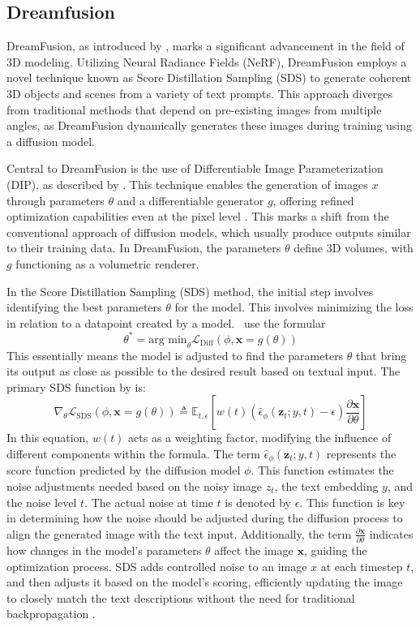 \subsection{Dreamfusion}\label{dreamfusion}

DreamFusion, as introduced by \citeauthor{pooleDreamfusion}, marks a significant advancement in the field of 3D modeling. Utilizing Neural Radiance Fields (NeRF), DreamFusion employs a novel technique known as Score Distillation Sampling (SDS) to generate coherent 3D objects and scenes from a variety of text prompts. This approach diverges from traditional methods that depend on pre-existing images from multiple angles, as DreamFusion dynamically generates these images during training using a diffusion model.

Central to DreamFusion is the use of Differentiable Image Parameterization (DIP), as described by \citep{mordvintsevDIP}. This technique enables the generation of images \( x \) through parameters \( \theta \) and a differentiable generator \( g \), offering refined optimization capabilities even at the pixel level \citep{pooleDreamfusion}. This marks a shift from the conventional approach of diffusion models, which usually produce outputs similar to their training data. In DreamFusion, the parameters \( \theta \) define 3D volumes, with \( g \) functioning as a volumetric renderer. 

In the Score Distillation Sampling (SDS) method, the initial step involves identifying the best parameters \( \theta \) for the model. This involves minimizing the loss in relation to a datapoint created by a model.~\citeauthor{pooleDreamfusion} use the formular~\[ \theta^{*} = \text{arg min}_{\theta} \mathcal{L}_{\text{Diff}}(\phi, \mathbf{x} = g(\theta)) \] This essentially means the model is adjusted to find the parameters \( \theta \) that bring its output as close as possible to the desired result based on textual input. The primary SDS function by \citeauthor{pooleDreamfusion} is:~\[
\nabla_{\theta}\mathcal{L}_{\text{SDS}}(\phi,\mathbf{x}=g(\theta))\triangleq\mathbb{E}_{t,\epsilon}\left[w(t)\left(\hat{\epsilon}_{\phi}({\mathbf{z}}_{t};y,t)-\epsilon\right){\frac{\partial\mathbf{x}}{\partial\theta}}\right]
\] In this equation, \( w(t) \) acts as a weighting factor, modifying the influence of different components within the formula. The term \( \hat{\epsilon}_{\phi}({\mathbf{z}}_{t};y,t) \) represents the score function predicted by the diffusion model \( \phi \). This function estimates the noise adjustments needed based on the noisy image \( z_t \), the text embedding \( y \), and the noise level \( t \). The actual noise at time \( t \) is denoted by \( \epsilon \). This function is key in determining how the noise should be adjusted during the diffusion process to align the generated image with the text input. Additionally, the term \( \frac{\partial\mathbf{x}}{\partial\theta} \) indicates how changes in the model’s parameters \( \theta \) affect the image \( \mathbf{x} \), guiding the optimization process. SDS adds controlled noise to an image \( x \) at each timestep \( t \), and then adjusts it based on the model's scoring, efficiently updating the image to closely match the text descriptions without the need for traditional backpropagation \citep{pooleDreamfusion}.

